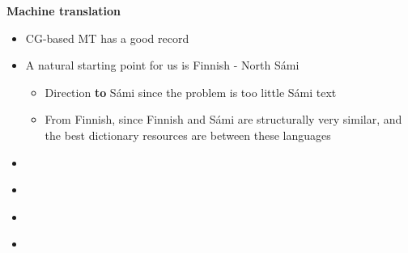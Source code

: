 \documentclass[landscape,english,11pt]{seminar}
\begin{document}
\begin{slide}
\begin{itemize}
\end{itemize}

\newslide
\textbf{Machine translation}
\begin{itemize}
\item CG-based MT has a good record
\item A natural starting point for us is Finnish - North Sámi
\begin{itemize}
\item Direction \textbf{to} Sámi since the problem is too little Sámi text
\item From Finnish, since Finnish and Sámi are structurally very similar, and the best dictionary resources are between these languages
\end{itemize}
\end{itemize}

\newslide
\textbf{}
\begin{itemize}
\item
\end{itemize}

\newslide
\textbf{}
\begin{itemize}
\item
\end{itemize}

\newslide
\textbf{}
\begin{itemize}
\item
\end{itemize}

\newslide
\textbf{}
\begin{itemize}
\item
\end{itemize}




\end{slide}
\end{document}
